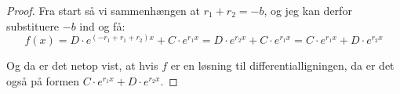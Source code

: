 \begin{proof}
Fra start så vi sammenhængen at $r_1 + r_2 = -b$, og jeg kan derfor substituere $-b$ ind og få:
$$f(x) = D \cdot e^{(-r_1 +r_1 + r_2)x} + C\cdot e^{r_1 x}= D \cdot e^{r_2 x} + C\cdot e^{r_1 x} = C\cdot e^{r_1 x} + D \cdot e^{r_2 x}$$

Og da er det netop vist, at hvis $f$ er en løsning til differentialligningen, da er det også på formen $C\cdot e^{r_1 x} + D \cdot e^{r_2 x}$.
\end{proof}